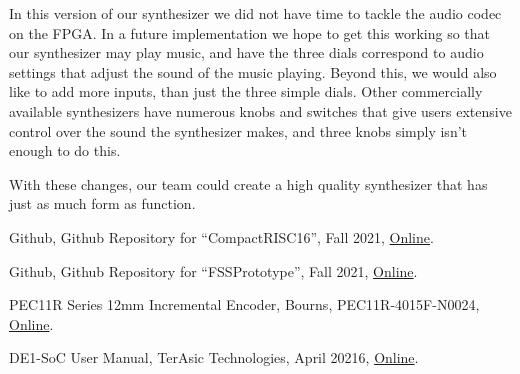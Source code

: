 \documentclass[conference]{IEEEtran}
\begin{document}
In this version of our synthesizer we did not have time to tackle the audio codec on the FPGA. In a future implementation we hope to get this working so that our synthesizer may play music, and have the three dials correspond to audio settings that adjust the sound of the music playing. Beyond this, we would also like to add more inputs, than just the three simple dials. Other commercially available synthesizers have numerous knobs and switches that give users extensive control over the sound the synthesizer makes, and three knobs simply isn't enough to do this.

With these changes, our team could create a high quality synthesizer that has just as much form as function.

\begin{thebibliography}{10}

  Github,
  Github Repository for ``CompactRISC16'',
  Fall 2021,
  \href{https://github.com/Petersoj/CompactRISC16}{Online}.

  Github,
  Github Repository for ``FSSPrototype'',
  Fall 2021,
  \href{https://github.com/Petersoj/FSSPrototype}{Online}.

  PEC11R Series 12mm Incremental Encoder,
  Bourns,
  PEC11R-4015F-N0024,
  \href{https://www.mouser.com/ProductDetail/Bourns/PEC11R-4015F-N0024?qs=Zq5ylnUbLm5obMMbrbYrpA\%3D\%3D}{Online}.

  DE1-SoC User Manual,
  TerAsic Technologies,
  April 20216,
  \href{https://www.intel.com/content/dam/www/programmable/us/en/portal/dsn/42/doc-us-dsnbk-42-1004282204-de1-soc-user-manual.pdf}{Online}.

\end{thebibliography}

\clearpage
{}

\end{document}
